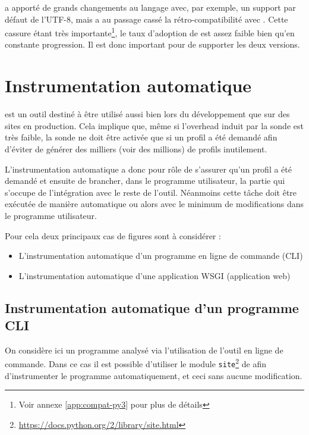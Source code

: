\begin{note}[Python 3]
 a apporté de grands changements au langage avec, par exemple, un support par défaut de l'UTF-8, mais a au passage cassé la rétro-compatibilité avec . Cette cassure étant très importante\footnote{Voir annexe \vref{app:compat-py3} pour plus de détails}, le taux d'adoption de  est assez faible bien qu'en constante progression. Il est donc important pour \Blackfire de supporter les deux versions.
\end{note}

  \chapter[Instrumentation]{Instrumentation automatique}
\Blackfire est un outil destiné à être utilisé aussi bien lors du développement que sur des sites en production. Cela implique que, même si l'\gls{overhead} induit par la sonde est très faible, la sonde ne doit être activée que si un profil a été demandé afin d'éviter de générer des milliers (voir des millions) de profils inutilement.

L'instrumentation automatique a donc pour rôle de s'assurer qu'un profil a été demandé et ensuite de brancher, dans le \gls{programme utilisateur}, la partie qui s'occupe de l'intégration avec le reste de l'outil. Néanmoins cette tâche doit être exécutée de manière automatique ou alors avec le minimum de modifications dans le programme utilisateur.

Pour cela deux principaux cas de figures sont à considérer :
\begin{itemize}
\item L'instrumentation automatique d'un programme en ligne de commande (\gls{CLI})
\item L'instrumentation automatique d'une application \gls{WSGI} (application web)
\end{itemize}
\clearpage
\section[Programme CLI]{Instrumentation automatique d'un programme CLI}
\label{sec:instru-pythonpath}
On considère ici un programme analysé via l'utilisation de l'outil en ligne de commande. Dans ce cas il est possible d'utiliser le module \verb|site|\footnote{\url{https://docs.python.org/2/library/site.html}} de \Python afin d'instrumenter le programme automatiquement, et ceci sans aucune modification.

